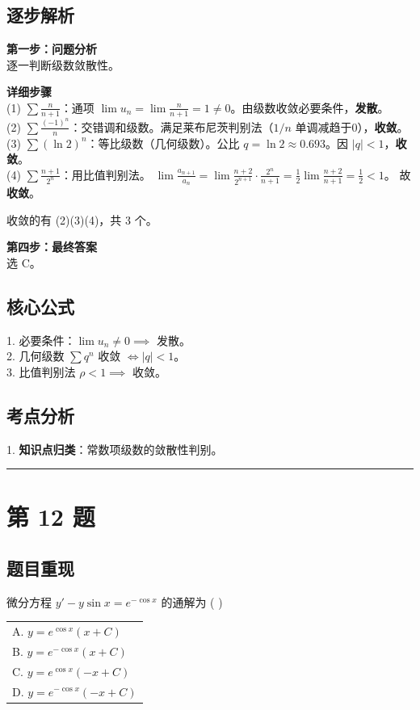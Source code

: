 \documentclass[10pt, a4paper]{ctexart}
\newcommand{\problemheader}{
    \vspace{0.5cm}
    \noindent\rule[0.5ex]{\linewidth}{2pt} %
}
\newcommand{\analysisheader}{
    \vspace{0.2cm}
    \noindent{\color{red}\rule[0.5ex]{\linewidth}{0.5pt}} %
    \vspace{0.1cm}
}
\begin{document}
\analysisheader
{\color{red}
\subsection*{逐步解析}
\textbf{第一步：问题分析} \\
逐一判断级数敛散性。

\textbf{详细步骤} \\
(1) $\sum \frac{n}{n+1}$：通项 $\lim u_n = \lim \frac{n}{n+1} = 1 \ne 0$。由级数收敛必要条件，\textbf{发散}。 \\
(2) $\sum \frac{(-1)^n}{n}$：交错调和级数。满足莱布尼茨判别法（$1/n$ 单调减趋于0），\textbf{收敛}。 \\
(3) $\sum (\ln 2)^n$：等比级数（几何级数）。公比 $q = \ln 2 \approx 0.693$。因 $|q| < 1$，\textbf{收敛}。 \\
(4) $\sum \frac{n+1}{2^n}$：用比值判别法。
$\lim \frac{a_{n+1}}{a_n} = \lim \frac{n+2}{2^{n+1}} \cdot \frac{2^n}{n+1} = \frac{1}{2} \lim \frac{n+2}{n+1} = \frac{1}{2} < 1$。
故\textbf{收敛}。

收敛的有 (2)(3)(4)，共 3 个。

\textbf{第四步：最终答案} \\
选 C。

\subsection*{核心公式}
1. 必要条件：$\lim u_n \ne 0 \implies$ 发散。 \\
2. 几何级数 $\sum q^n$ 收敛 $\iff |q|<1$。 \\
3. 比值判别法 $\rho < 1 \implies$ 收敛。

\subsection*{考点分析}
1. \textbf{知识点归类}：常数项级数的敛散性判别。
}

\problemheader
\section*{第 12 题}
\subsection*{题目重现}
微分方程 $y' - y\sin x = e^{-\cos x}$ 的通解为 ( \quad ) \\
\begin{tabularx}{\linewidth}{@{} *{1}{X} @{}}
    A. $y = e^{\cos x}(x+C)$ \\
    B. $y = e^{-\cos x}(x+C)$ \\
    C. $y = e^{\cos x}(-x+C)$ \\
    D. $y = e^{-\cos x}(-x+C)$
\end{tabularx}
\end{document}
